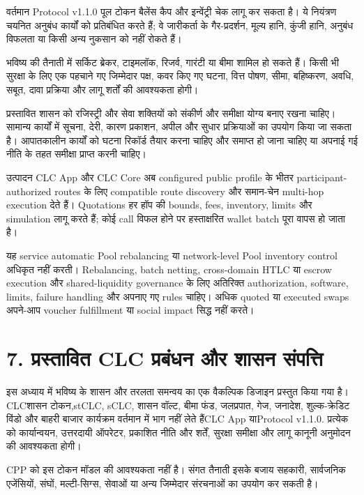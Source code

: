 \documentclass[11pt]{article}
\begin{document}
वर्तमान Protocol v1.1.0 पूल टोकन बैलेंस कैप और इन्वेंट्री चेक लागू कर सकता है। ये नियंत्रण चयनित अनुबंध कार्यों को प्रतिबंधित करते हैं; वे जारीकर्ता के गैर-प्रदर्शन, मूल्य हानि, कुंजी हानि, अनुबंध विफलता या किसी अन्य नुकसान को नहीं रोकते हैं।

भविष्य की तैनाती में सर्किट ब्रेकर, टाइमलॉक, रिजर्व, गारंटी या बीमा शामिल हो सकते हैं। किसी भी सुरक्षा के लिए एक पहचाने गए जिम्मेदार पक्ष, कवर किए गए घटना, वित्त पोषण, सीमा, बहिष्करण, अवधि, सबूत, दावा प्रक्रिया और लागू शर्तों की आवश्यकता होगी।

प्रस्तावित शासन को रजिस्ट्री और सेवा शक्तियों को संकीर्ण और समीक्षा योग्य बनाए रखना चाहिए। सामान्य कार्यों में सूचना, देरी, कारण प्रकाशन, अपील और सुधार प्रक्रियाओं का उपयोग किया जा सकता है। आपातकालीन कार्यों को घटना रिकॉर्ड तैयार करना चाहिए और समाप्त हो जाना चाहिए या अपनाई गई नीति के तहत समीक्षा प्राप्त करनी चाहिए।

उत्पादन CLC App और CLC Core अब configured public profile के भीतर participant-authorized routes के लिए compatible route discovery और समान-चेन multi-hop execution देते हैं। Quotations हर हॉप की bounds, fees, inventory, limits और simulation लागू करते हैं; कोई call विफल होने पर हस्ताक्षरित wallet batch पूरा वापस हो जाता है।

यह service automatic Pool rebalancing या network-level Pool inventory control अधिकृत नहीं करती। Rebalancing, batch netting, cross-domain HTLC या escrow execution और shared-liquidity governance के लिए अतिरिक्त authorization, software, limits, failure handling और अपनाए गए rules चाहिए। अधिक quoted या executed swaps अपने-आप voucher fulfillment या social impact सिद्ध नहीं करते।


\section*{7. प्रस्तावित CLC प्रबंधन और शासन संपत्ति}

इस अध्याय में भविष्य के शासन और तरलता समन्वय का एक वैकल्पिक डिजाइन प्रस्तुत किया गया है।CLCशासन टोकन,stCLC, sCLC, शासन वॉल्ट, बीमा फंड, जलप्रपात, गेज, जनादेश, शुल्क-क्रेडिट विंडो और बाहरी बाजार कार्यक्रम वर्तमान में भाग नहीं लेते हैंCLC App याProtocol v1.1.0. प्रत्येक को कार्यान्वयन, उत्तरदायी ऑपरेटर, प्रकाशित नीति और शर्तें, सुरक्षा समीक्षा और लागू कानूनी अनुमोदन की आवश्यकता होगी।

CPP को इस टोकन मॉडल की आवश्यकता नहीं है। संगत तैनाती इसके बजाय सहकारी, सार्वजनिक एजेंसियों, संघों, मल्टी-सिग्स, सेवाओं या अन्य जिम्मेदार संरचनाओं का उपयोग कर सकती है।
\end{document}
